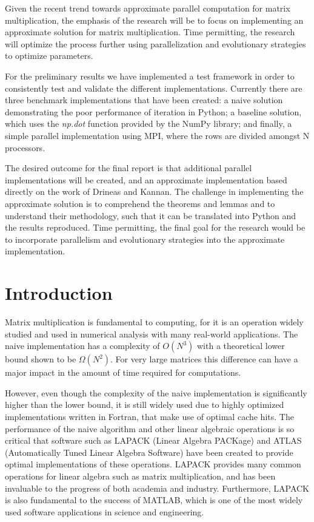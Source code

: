 \documentclass[oneside]{article}
\begin{document}
Given the recent trend towards approximate parallel computation for matrix multiplication, the emphasis of the research will be to focus on implementing an approximate solution for matrix multiplication. Time permitting, the research will optimize the process further using parallelization and evolutionary strategies to optimize parameters.

For the preliminary results we have implemented a test framework in order to consistently test and validate the different implementations. Currently there are three benchmark implementations that have been created: a naive solution demonstrating the poor performance of iteration in Python; a baseline solution, which uses the \emph{np.dot} function provided by the NumPy library; and finally, a simple parallel implementation using MPI, where the rows are divided amongst N processors.

The desired outcome for the final report is that additional parallel implementations will be created, and an approximate implementation based directly on the work of Drineas and Kannan\cite{drineas2001fast}. The challenge in implementing the approximate solution is to comprehend the theorems and lemmas and to understand their methodology, such that it can be translated into Python and the results reproduced. Time permitting, the final goal for the research would be to incorporate parallelism and evolutionary strategies into the approximate implementation.



\section{Introduction}

Matrix multiplication is fundamental to computing, for it is an operation widely studied and used in numerical analysis with many real-world applications. The naive implementation has a complexity of $O(N^{3})$\cite{raz2002complexity} with a theoretical lower bound shown to be $\Omega(N^{2})$\cite{raz2002complexity}. For very large matrices this difference can have a major impact in the amount of time required for computations.

However, even though the complexity of the naive implementation is significantly higher than the lower bound, it is still widely used due to highly optimized implementations written in Fortran, that make use of optimal cache hits\cite{note2002reducing}. The performance of the naive algorithm and other linear algebraic operations is so critical that software such as LAPACK (Linear Algebra PACKage)\cite{lapackweb} and ATLAS (Automatically Tuned Linear Algebra Software)\cite{whaley2001automated} have been created to provide optimal implementations of these operations. LAPACK provides many common operations for linear algebra such as matrix multiplication, and has been invaluable to the progress of both academia and industry. Furthermore, LAPACK is also fundamental to the success of MATLAB\cite{matlab2000}, which is one of the most widely used software applications in science and engineering.
\end{document}
